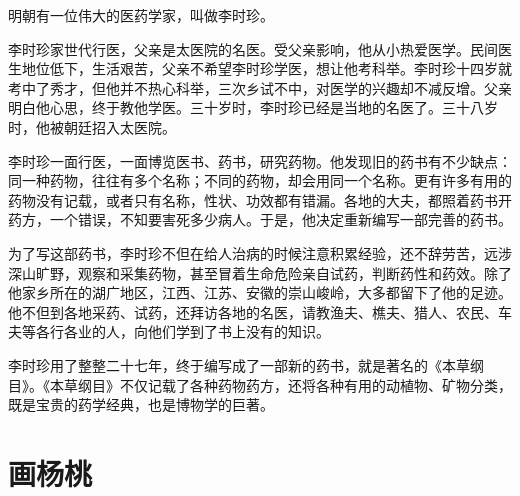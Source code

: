 \documentclass[12pt,UTF-8,openany]{ctexbook}
\begin{document}
\begin{Large}
    
    明朝有一位伟大的医药学家，叫做李时珍。
    
    李时珍家世代行医，父亲是太医院的名医。受父亲影响，他从小热爱医学。民间医生地位低下，生活艰苦，父亲不希望李时珍学医，想让他考科举。李时珍十四岁就考中了秀才，但他并不热心科举，三次乡试不中，对医学的兴趣却不减反增。父亲明白他心思，终于教他学医。三十岁时，李时珍已经是当地的名医了。三十八岁时，他被朝廷招入太医院。
    
    李时珍一面行医，一面博览医书、药书，研究药物。他发现旧的药书有不少缺点：同一种药物，往往有多个名称；不同的药物，却会用同一个名称。更有许多有用的药物没有记载，或者只有名称，性状、功效都有错漏。各地的大夫，都照着药书开药方，一个错误，不知要害死多少病人。于是，他决定重新编写一部完善的药书。
    
    为了写这部药书，李时珍不但在给人治病的时候注意积累经验，还不辞劳苦，远涉深山旷野，观察和采集药物，甚至冒着生命危险亲自试药，判断药性和药效。除了他家乡所在的湖广地区，江西、江苏、安徽的崇山峻岭，大多都留下了他的足迹。他不但到各地采药、试药，还拜访各地的名医，请教渔夫、樵夫、猎人、农民、车夫等各行各业的人，向他们学到了书上没有的知识。
    
    李时珍用了整整二十七年，终于编写成了一部新的药书，就是著名的《本草纲目》。《本草纲目》不仅记载了各种药物药方，还将各种有用的动植物、矿物分类，既是宝贵的药学经典，也是博物学的巨著。
    
\end{Large}

\chapter{画杨桃}
\end{document}

